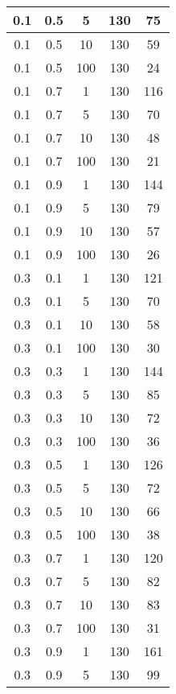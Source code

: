 \begin{appendices}
\begin{longtable}{|c|c|c|c|c|}
		0.1   & 0.5    & 5    & 130   & 75    \\ \hline
		0.1   & 0.5    & 10   & 130   & 59    \\ \hline
		0.1   & 0.5    & 100  & 130   & 24    \\ \hline
		0.1   & 0.7    & 1    & 130   & 116   \\ \hline
		0.1   & 0.7    & 5    & 130   & 70    \\ \hline
		0.1   & 0.7    & 10   & 130   & 48    \\ \hline
		0.1   & 0.7    & 100  & 130   & 21    \\ \hline
		0.1   & 0.9    & 1    & 130   & 144   \\ \hline
		0.1   & 0.9    & 5    & 130   & 79    \\ \hline
		0.1   & 0.9    & 10   & 130   & 57    \\ \hline
		0.1   & 0.9    & 100  & 130   & 26    \\ \hline
		0.3   & 0.1    & 1    & 130   & 121   \\ \hline
		0.3   & 0.1    & 5    & 130   & 70    \\ \hline
		0.3   & 0.1    & 10   & 130   & 58    \\ \hline
		0.3   & 0.1    & 100  & 130   & 30    \\ \hline
		0.3   & 0.3    & 1    & 130   & 144   \\ \hline
		0.3   & 0.3    & 5    & 130   & 85    \\ \hline
		0.3   & 0.3    & 10   & 130   & 72    \\ \hline
		0.3   & 0.3    & 100  & 130   & 36    \\ \hline
		0.3   & 0.5    & 1    & 130   & 126   \\ \hline
		0.3   & 0.5    & 5    & 130   & 72    \\ \hline
		0.3   & 0.5    & 10   & 130   & 66    \\ \hline
		0.3   & 0.5    & 100  & 130   & 38    \\ \hline
		0.3   & 0.7    & 1    & 130   & 120   \\ \hline
		0.3   & 0.7    & 5    & 130   & 82    \\ \hline
		0.3   & 0.7    & 10   & 130   & 83    \\ \hline
		0.3   & 0.7    & 100  & 130   & 31    \\ \hline
		0.3   & 0.9    & 1    & 130   & 161   \\ \hline
		0.3   & 0.9    & 5    & 130   & 99    \\ \hline

\end{longtable}
\end{appendices}
